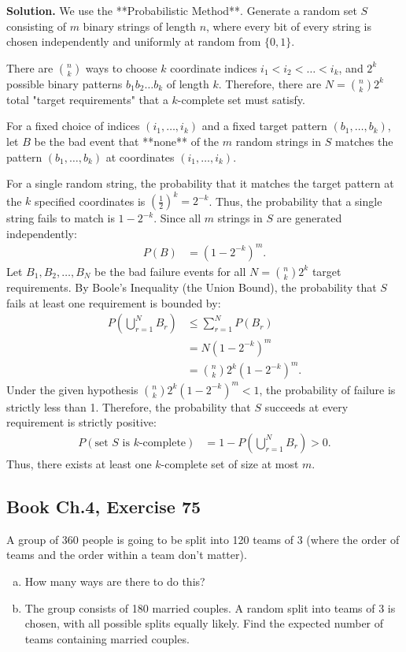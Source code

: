\documentclass[11pt,a4paper]{article}
\begin{document}
\noindent \textbf{Solution.} We use the **Probabilistic Method**. Generate a random set $S$ consisting of $m$ binary strings of length $n$, where every bit of every string is chosen independently and uniformly at random from $\{0, 1\}$.

There are $\binom{n}{k}$ ways to choose $k$ coordinate indices $i_1 < i_2 < \dots < i_k$, and $2^k$ possible binary patterns $b_1 b_2 \dots b_k$ of length $k$. Therefore, there are $N = \binom{n}{k} 2^k$ total "target requirements" that a $k$-complete set must satisfy.

For a fixed choice of indices $(i_1, \dots, i_k)$ and a fixed target pattern $(b_1, \dots, b_k)$, let $B$ be the bad event that **none** of the $m$ random strings in $S$ matches the pattern $(b_1, \dots, b_k)$ at coordinates $(i_1, \dots, i_k)$. 

For a single random string, the probability that it matches the target pattern at the $k$ specified coordinates is $\left(\frac{1}{2}\right)^k = 2^{-k}$. Thus, the probability that a single string fails to match is $1 - 2^{-k}$. Since all $m$ strings in $S$ are generated independently:
\begin{align*}
P(B) &= \left(1 - 2^{-k}\right)^m.
\end{align*}
Let $B_1, B_2, \dots, B_N$ be the bad failure events for all $N = \binom{n}{k} 2^k$ target requirements. By Boole's Inequality (the Union Bound), the probability that $S$ fails at least one requirement is bounded by:
\begin{align*}
P\left( \bigcup_{r=1}^{N} B_r \right) &\le \sum_{r=1}^{N} P(B_r) \\
&= N \left(1 - 2^{-k}\right)^m \\
&= \binom{n}{k} 2^k \left(1 - 2^{-k}\right)^m.
\end{align*}
Under the given hypothesis $\binom{n}{k} 2^k \left(1 - 2^{-k}\right)^m < 1$, the probability of failure is strictly less than 1. Therefore, the probability that $S$ succeeds at every requirement is strictly positive:
\begin{align*}
P(\text{set } S \text{ is } k\text{-complete}) &= 1 - P\left( \bigcup_{r=1}^{N} B_r \right) > 0.
\end{align*}
Thus, there exists at least one $k$-complete set of size at most $m$.

\vspace{10pt}
\subsection{Book Ch.4, Exercise 75}
\begin{tcolorbox}[title={Book Ch.4, Exercise 75}]
A group of 360 people is going to be split into 120 teams of 3 (where the order of teams and the order within a team don't matter).
\begin{enumerate}[(a)]
\item How many ways are there to do this?
\item The group consists of 180 married couples. A random split into teams of 3 is chosen, with all possible splits equally likely. Find the expected number of teams containing married couples.
\end{enumerate}
\end{tcolorbox}
\end{document}
